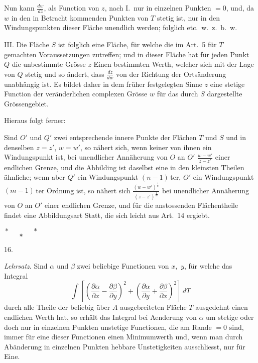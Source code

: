 \documentclass[a4paper,12pt]{article}
\newcommand{\asterisktriangle}{\centerline{${\displaystyle
   * \hskip 36pt * \atop \displaystyle *}$}}
\begin{document}
Nun kann
$\displaystyle \frac{dw}{dz}$,
als Function von $z$, nach I.\ nur in einzelnen Punkten $= 0$,
und, da $w$ in den in Betracht kommenden Punkten von $T$ stetig
ist, nur in den Windungspunkten dieser Fl\"{a}che unendlich
werden; folglich etc.\ w.~z.~b.~w.

III.  Die Fl\"{a}che $S$ ist folglich eine Fl\"{a}che, f\"{u}r
welche die im Art.~5 f\"{u}r $T$ gemachten Voraussetzungen
zutreffen; und in dieser Fl\"{a}che hat f\"{u}r jeden Punkt~$Q$
die unbestimmte Gr\"{o}sse $z$ Einen bestimmten Werth, welcher
sich mit der Lage von $Q$ stetig und so \"{a}ndert, dass
$\displaystyle \frac{dz}{dw}$
von der Richtung der Orts\"{a}nderung unabh\"{a}ngig ist.  Es
bildet daher in dem fr\"{u}her festgelegten Sinne $z$ eine
stetige Function der ver\"{a}nderlichen complexen Gr\"{o}sse $w$
f\"{u}r das durch $S$ dargestellte Gr\"{o}ssengebiet.

Hieraus folgt ferner:

Sind $O'$ und $Q'$ zwei entsprechende innere Punkte der
Fl\"{a}chen $T$ und $S$ und in denselben $z = z'$, $w = w'$, so
n\"{a}hert sich, wenn keiner von ihnen ein Windungspunkt ist, bei
unendlicher Ann\"{a}herung von $O$ an $O'$
$\displaystyle \frac{w - w'}{z - z'}$
einer endlichen Grenze, und die Abbilding ist daselbst eine in
den kleinsten Theilen \"{a}hnliche; wenn aber $Q'$ ein
Windungspunkt $(n - 1) \,$\-ter, $O'$ ein Windungspunkt $(m - 1) \,$\-ter
Ordnung ist, so n\"{a}hert sich
$\displaystyle \frac{(w - w')^{\frac{1}{n}}}{(z - z')^{\frac{1}{m}}}$
bei unendlicher Ann\"{a}herung von $O$ an $O'$ einer endlichen
Grenze, und f\"{u}r die anstossenden Fl\"{a}chentheile findet
eine Abbildungsart Statt, die sich leicht aus Art.~14 ergiebt.

\nobreak\medskip

\asterisktriangle

\medbreak

\centerline{16.}

\nobreak\medskip

\emph{Lehrsatz}.  Sind $\alpha$ und $\beta$ zwei beliebige
Functionen von $x$,~$y$, f\"{u}r welche das Integral
\[ \int
      \left[
         \left(
            \frac{\partial \alpha}{\partial x}
          - \frac{\partial \beta }{\partial y}
         \right)^2
       + \left(
            \frac{\partial \alpha}{\partial y}
          + \frac{\partial \beta }{\partial x}
         \right)^2
      \right] \, dT \]
durch alle Theile der beliebig \"{u}ber $A$ ausgebreiteten
Fl\"{a}che $T$ ausgedehnt einen endlichen Werth hat, so
erh\"{a}lt das Integral bei Aenderung von $\alpha$ um stetige
oder doch nur in einzelnen Punkten unstetige Functionen, die am
Rande $= 0$ sind, immer f\"{u}r eine dieser Functionen einen
Minimumwerth und, wenn man durch Ab\"{a}nderung in einzelnen
Punkten hebbare Unstetigkeiten ausschliesst, nur f\"{u}r Eine.
\end{document}
